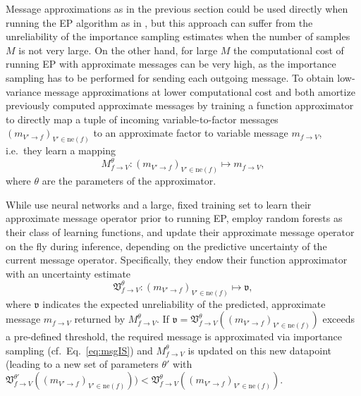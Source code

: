 \documentclass[english]{article}
\theoremstyle{plain}
\theoremstyle{plain}
\newcommand{\factor}{f}				%
\newcommand{\outV}{V}                         %
\newcommand{\fis}[1]{\mathrm{ne}(#1)}   	%
\newcommand{\msg}[2]{m_{#1 \rightarrow #2}}			%
\newcommand{\approxMsg}[3]{M_{#1 \rightarrow #2}^{#3}}			%
\newcommand{\uncert}{{\mathfrak v}}          %
\newcommand{\uncertaintyMsg}[3]{{\mathfrak V}_{#1 \rightarrow #2}^{#3}}			%
\newcommand{\wjnote}[1]{ }
\begin{document}
Message approximations as in the previous section could be 
used directly when running the EP algorithm as in \cite{Barthelme2011}, 
but this approach can suffer from the unreliability of the importance sampling estimates when the number of samples $M$ is not very large. 
On the other hand, for large $M$ the computational cost of running EP 
with approximate messages can be very high, 
as the importance sampling has to be performed for sending each outgoing message.
To obtain low-variance message approximations at lower computational cost \cite{Heess2013} and \cite{Eslami2014} both amortize previously computed approximate messages by training a function approximator to directly map a tuple of incoming variable-to-factor messages $(\msg{\outV'}{\factor} )_{\outV' \in \fis{\factor}}$ to an approximate factor to variable message $\msg{\factor}{\outV}$, i.e.\ they learn a mapping
\begin{equation}
\approxMsg{\factor}{\outV}{\theta}: (\msg{\outV'}{\factor} )_{\outV' \in \fis{\factor}} \mapsto \msg{\factor}{\outV},
\end{equation}
where $\theta$ are the parameters of the approximator.


While \cite{Heess2013} use neural networks and a large, fixed training set to learn their approximate message operator prior to running EP, \cite{Eslami2014}
employ random forests as their class of learning functions, and update their approximate message operator on the fly during inference, depending on the predictive uncertainty of the current message operator. Specifically, they endow their function approximator with an uncertainty estimate
\begin{equation}
\uncertaintyMsg{\factor}{\outV}{\theta}: (\msg{\outV'}{\factor} )_{\outV' \in \fis{\factor}} \mapsto \uncert,
\end{equation}
where $\uncert$ indicates the expected unreliability  of the predicted, approximate message $\msg{\factor}{\outV}$ returned by $\approxMsg{\factor}{\outV}{\theta}$. If $\uncert = \uncertaintyMsg{\factor}{\outV}{\theta} \left( (\msg{\outV'}{\factor} )_{\outV' \in \fis{\factor}}\right)$ 
exceeds a pre-defined threshold, the required message is approximated via importance sampling (cf.\ Eq.\ \ref{eq:msgIS}) and $\approxMsg{\factor}{\outV}{\theta}$ is updated
on this new datapoint (leading to a new set of parameters  $\theta'$ with $\uncertaintyMsg{\factor}{\outV}{\theta'} \left( (\msg{\outV'}{\factor} )_{\outV' \in \fis{\factor}}\right)) < \uncertaintyMsg{\factor}{\outV}{\theta} \left( (\msg{\outV'}{\factor} )_{\outV' \in \fis{\factor}}\right)$.
\end{document}
